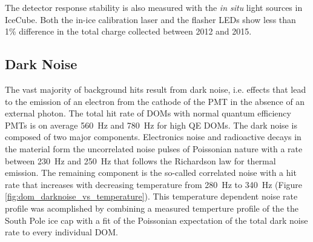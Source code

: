 The detector response stability is also measured with the {\it in
  situ} light sources in IceCube. Both the in-ice calibration laser
\cite{IC3:SC} and the flasher LEDs show less than 1\% difference in the total
charge collected between 2012 and 2015. 

\subsection{\label{sect:darknoise}Dark Noise}

The vast majority of background hits result from dark noise, i.e. effects that lead to the emission of an electron from the cathode of the PMT in the absence of an external photon. The total hit rate of DOMs with normal quantum efficiency PMTs is on average \SI{560}{\hertz} and \SI{780}{\hertz} for high QE DOMs. 
The dark noise is composed of two major components. Electronics noise and radioactive decays in the material form the uncorrelated noise pulses of Poissonian nature with a rate between \SI{230}{\hertz} and \SI{250}{\hertz} that follows the Richardson law for thermal emission. 
The remaining component is the so-called correlated noise
with a hit rate that increases with decreasing temperature from \SI{280}{\hertz} to \SI{340}{\hertz} (Figure \ref{fig:dom_darknoise_vs_temperature}). 
This temperature dependent noise rate profile was acomplished by combining a measured temperture profile of the the South Pole ice cap \cite{price2002temperature} with a fit of the Poissonian expectation of the total dark noise rate to every individual DOM.

